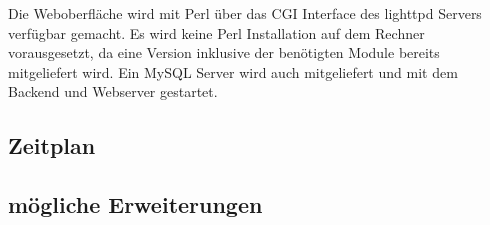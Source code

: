 \documentclass[12pt,a4paper]{article}
\begin{document}
Die Weboberfläche wird mit Perl über das CGI Interface des lighttpd Servers verfügbar gemacht. Es wird keine Perl Installation auf dem Rechner vorausgesetzt, da eine Version inklusive der benötigten Module bereits mitgeliefert wird. Ein MySQL Server wird auch mitgeliefert und mit dem Backend und Webserver gestartet.


\subsection{Zeitplan}
\subsection{mögliche Erweiterungen}
\end{document}
